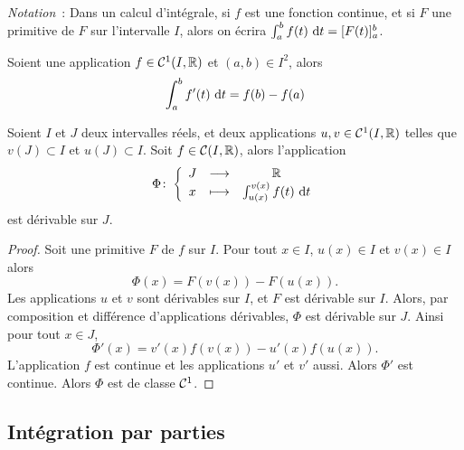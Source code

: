 \emph{Notation}~: Dans un calcul d'intégrale, si \(f\) est une fonction continue,  et si \(F\) une primitive de \(F\) sur l'intervalle \(I\), alors on écrira \(\int_a^b f(t)\,\mathop{}\mathopen{}\mathrm{d} t=[F(t)]_a^b\).

\begin{corth}
  Soient une application \(f \in \mathcal{C}^{1}(I,\mathbb{R})\) et \((a,b) \in I^2\), alors
  \begin{equation}
    \int_a^b f'(t)\,\mathop{}\mathopen{}\mathrm{d} t=f(b)-f(a)
  \end{equation}
\end{corth}

\begin{prop}
  Soient \(I\) et \(J\) deux intervalles réels, et deux applications \(u,v \in \mathcal{C}^{1}(I,\mathbb{R})\) telles que \(v(J) \subset I\) et \(u(J) \subset I\). Soit \(f \in \mathcal{C}(I,\mathbb{R})\), alors l'application
  \begin{equation}
    \Phi\colon \left\{\begin{array}{ccc} J & \longrightarrow &\mathbb{R}\\ x & \longmapsto & \int_{u(x)}^{v(x)}f(t)\,\mathop{}\mathopen{}\mathrm{d} t \end{array} \right.
  \end{equation}
  est dérivable sur \(J\).
\end{prop}
\begin{proof}
  Soit une primitive \(F\) de \(f\) sur \(I\). Pour tout \(x \in I\), \(u(x) \in I\) et \(v(x) \in I\) alors
  \begin{equation}
    \Phi(x) = F(v(x))-F(u(x)).
  \end{equation}
  Les applications \(u\) et \(v\) sont dérivables sur \(I\), et \(F\) est dérivable sur \(I\). Alors, par composition et différence d'applications dérivables, \(\Phi\) est dérivable sur \(J\). Ainsi pour tout \(x \in J\),
  \begin{equation}
    \Phi'(x) = v'(x)f(v(x)) -u'(x)f(u(x)).
  \end{equation}
  L'application \(f\) est continue et les applications \(u'\) et \(v'\) aussi. Alors \(\Phi'\) est continue. Alors \(\Phi\) est de classe \(\mathcal{C}^{1}\).
\end{proof}

\subsection{Intégration par parties}

